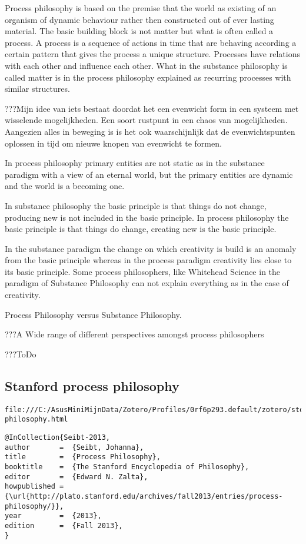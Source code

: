 \documentclass[a4paper]{Thesis}
\begin{document}
Process philosophy is based on the premise that the world as existing of an organism of dynamic behaviour rather then constructed out of ever lasting material. The basic building block is not matter but what is often called a process. A process is a sequence of actions in time that are behaving according a certain pattern that gives the process a unique structure. Processes have relations with each other and influence each other. What in the substance philosophy is called matter is in the process philosophy explained as recurring processes with similar structures.

???Mijn idee van iets bestaat doordat het een evenwicht form in een systeem met wisselende mogelijkheden. Een soort rustpunt in een chaos van mogelijkheden.
Aangezien alles in beweging is is het ook waarschijnlijk dat de evenwichtspunten oplossen in tijd om nieuwe knopen van evenwicht te formen.

In process philosophy primary entities are not static as in the substance paradigm with a view of an eternal world, but the primary entities are dynamic and the world is a becoming one.

In substance philosophy the basic principle is that things do not change, producing new is not included in the basic principle.
In process philosophy the basic principle is that things do change, creating new is the basic principle.

In the substance paradigm the change on which creativity is build is an anomaly from the basic principle whereas in the process paradigm creativity lies close to its basic principle. Some process philosophers, like Whitehead \cite{whitehead1929process} Science in the paradigm of Substance Philosophy can not explain everything as in the case of creativity.

Process Philosophy versus Substance Philosophy.

???A Wide range of different  perspectives amongst process philosophers

???ToDo

\subsection{Stanford process philosophy}
\begin{verbatim}
file:///C:/AsusMiniMijnData/Zotero/Profiles/0rf6p293.default/zotero/storage/TRSB7DQH/process-philosophy.html
\end{verbatim}


\begin{verbatim}
@InCollection{Seibt-2013,
author       =	{Seibt, Johanna},
title        =	{Process Philosophy},
booktitle    =	{The Stanford Encyclopedia of Philosophy},
editor       =	{Edward N. Zalta},
howpublished =	{\url{http://plato.stanford.edu/archives/fall2013/entries/process-philosophy/}},
year         =	{2013},
edition      =	{Fall 2013},
}
\end{verbatim}
\end{document}
